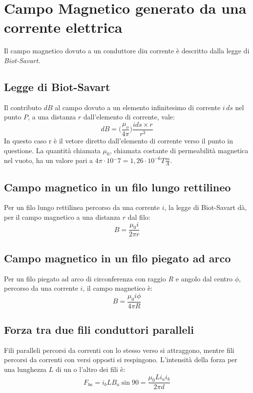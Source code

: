     \section{Campo Magnetico generato da una corrente elettrica} Il campo 
    magnetico dovuto a un conduttore diu corrente è descritto dalla legge di
    \textit{Biot-Savart}.

        \subsection{Legge di Biot-Savart} Il contributo $dB$ al campo dovuto a
        un elemento infinitesimo di corrente $i\,ds$ nel punto $P$, a una
        distanza $r$ dall'elemento di corrente, vale:
            \begin{equation}
                dB = \Bigg(\frac{\mu_o}{4\pi}\Bigg)\frac{ids\times r}{r^3}
            \end{equation}
        In questo caso r è il vetore diretto dall'elemento di corrente verso il
        punto in questione. La quantità chiamata $\mu_0$, chiamata costante di 
        permeabilità magnetica nel vuoto, ha un valore pari a $4\pi \cdot 
        10{^-7} = 1,26 \cdot 10^{-6} T \frac{m}{A}$.

        \subsection{Campo magnetico in un filo lungo rettilineo} Per un filo 
        lungo rettilinea percorso da una corrente $i$, la legge di Biot-Savart 
        dà, per il campo magnetico a una distanza $r$ dal filo:
            \begin{equation}
                B = \frac{\mu_0i}{2\pi r}
            \end{equation}

        \subsection{Campo magnetico in un filo piegato ad arco} Per un filo 
        piegato ad arco di circonferenza con raggio $R$ e angolo dal centro 
        $\phi$, percorso da una corrente $i$, il campo magnetico è:
            \begin{equation}
                B = \frac{\mu_0i\phi}{4\pi R}
            \end{equation}
        
        \subsection{Forza tra due fili conduttori paralleli} Fili paralleli 
        percorsi da correnti con lo stesso verso si attraggono, mentre fili 
        percorsi da correnti con versi opposti si respingono. L'intensità della
        forza per una lunghezza $L$ di un o l'altro dei fili è:
            \begin{equation}
                F_{ba} = i_bLB_a\sin90 = \frac{\mu_0Li_ai_b}{2\pi d}
            \end{equation}

